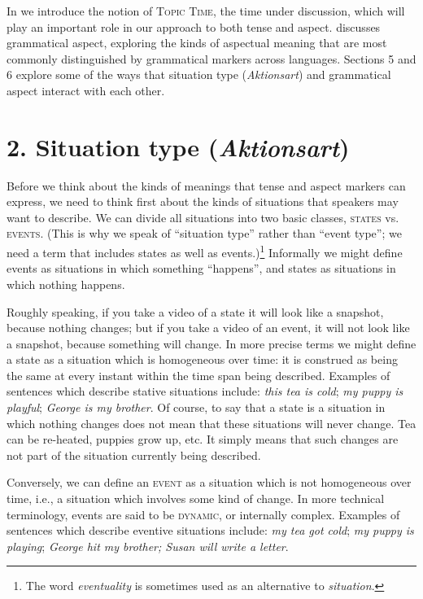 In  we introduce the notion of \textsc{Topic Time}, the time under discussion, which will play an important role in our approach to both tense and aspect.  discusses grammatical aspect, exploring the kinds of aspectual meaning that are most commonly distinguished by grammatical markers across languages. Sections 5 and 6 explore some of the ways that situation type (\textit{Aktionsart}) and grammatical aspect interact with each other.


\section{2. Situation type (\textit{Aktionsart})}\label{sec:}

Before we think about the kinds of meanings that tense and aspect markers can express, we need to think first about the kinds of situations that speakers may want to describe. We can divide all situations into two basic classes, \textsc{states} vs. \textsc{events}. (This is why we speak of “situation type” rather than “event type”; we need a term that includes states as well as events.)\footnote{The word \textit{eventuality} is sometimes used as an alternative to \textit{situation}.} Informally we might define events as situations in which something “happens”, and states as situations in which nothing happens.



Roughly speaking, if you take a video of a state it will look like a snapshot, because nothing changes; but if you take a video of an event, it will not look like a snapshot, because something will change. In more precise terms we might define a state as a situation which is homogeneous over time: it is construed as being the same at every instant within the time span being described. Examples of sentences which describe stative situations include: \textit{this tea is cold}; \textit{my puppy is playful}; \textit{George is my brother}. Of course, to say that a state is a situation in which nothing changes does not mean that these situations will never change. Tea can be re-heated, puppies grow up, etc. It simply means that such changes are not part of the situation currently being described.



Conversely, we can define an \textsc{event} as a situation which is not homogeneous over time, i.e., a situation which involves some kind of change. In more technical terminology, events are said to be \textsc{dynamic}, or internally complex. Examples of sentences which describe eventive situations include: \textit{my tea got cold}; \textit{my puppy is playing}; \textit{George hit my brother; Susan will write a letter}.



